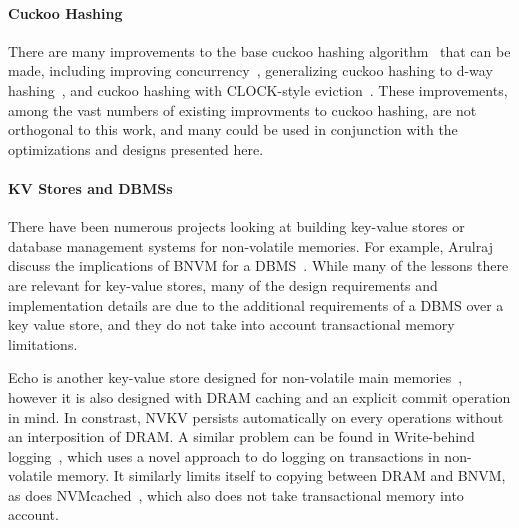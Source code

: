 \paragraph{Cuckoo Hashing}

There are many improvements to the base cuckoo hashing
algorithm~\cite{Pagh:2004} that can be made, including improving
concurrency~\cite{Li:2014ch}, generalizing cuckoo hashing to d-way
hashing~\cite{Fotakis:hashing}, and cuckoo hashing with CLOCK-style
eviction~\cite{Fan:2013}. These improvements, among the vast numbers of existing
improvments to cuckoo hashing, are not orthogonal to this work, and many could
be used in conjunction with the optimizations and designs presented here.

\paragraph{KV Stores and DBMSs}

There have been numerous projects looking at building key-value stores or
database management systems for non-volatile memories. For example, Arulraj
\etal discuss the implications of BNVM for a DBMS~\cite{Arulraj:2017}. While
many of the lessons there are relevant for key-value stores, many of the design
requirements and implementation details are due to the additional requirements
of a DBMS over a key value store, and they do not take into account
transactional memory limitations.


Echo is another key-value store designed for non-volatile main
memories~\cite{echo}, however it is also designed with DRAM caching and an
explicit commit operation in mind. In constrast, NVKV persists automatically on
every operations without an interposition of DRAM. A similar problem can be
found in Write-behind logging~\cite{Arulraj:2016wbl}, which uses a novel approach to do logging on
transactions in non-volatile memory. It similarly limits itself to copying
between DRAM and BNVM, as does NVMcached~\cite{Wu:2016}, which also does not
take transactional memory into account.


